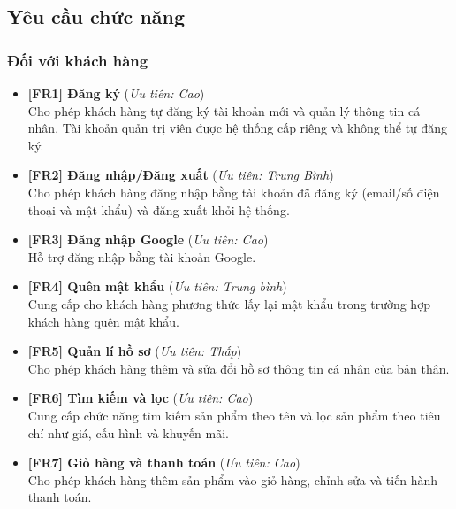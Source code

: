 \subsection{Yêu cầu chức năng}

 \subsubsection{Đối với khách hàng}

\begin{itemize}

\item \textbf{[FR1] Đăng ký} \hfill (\textit{Ưu tiên: Cao})\\
    Cho phép khách hàng tự đăng ký tài khoản mới và quản lý thông tin cá nhân. Tài khoản quản trị viên được hệ thống cấp riêng và không thể tự đăng ký.

\item \textbf{[FR2] Đăng nhập/Đăng xuất} \hfill (\textit{Ưu tiên: Trung Bình})\\
    Cho phép khách hàng đăng nhập bằng tài khoản đã đăng ký (email/số điện thoại và mật khẩu) và đăng xuất khỏi hệ thống.

\item \textbf{[FR3] Đăng nhập Google} \hfill (\textit{Ưu tiên: Cao})\\
    Hỗ trợ đăng nhập bằng tài khoản Google.

\item \textbf{[FR4] Quên mật khẩu} \hfill (\textit{Ưu tiên: Trung bình})\\
    Cung cấp cho khách hàng phương thức lấy lại mật khẩu trong trường hợp khách hàng quên mật khẩu.

\item \textbf{[FR5] Quản lí hồ sơ} \hfill (\textit{Ưu tiên: Thấp})\\
    Cho phép khách hàng thêm và sửa đổi hồ sơ thông tin cá nhân của bản thân.

\item \textbf{[FR6] Tìm kiếm và lọc} \hfill (\textit{Ưu tiên: Cao})\\
    Cung cấp chức năng tìm kiếm sản phẩm theo tên và lọc sản phẩm theo tiêu chí như giá, cấu hình và khuyến mãi.

\item \textbf{[FR7] Giỏ hàng và thanh toán} \hfill (\textit{Ưu tiên: Cao})\\
    Cho phép khách hàng thêm sản phẩm vào giỏ hàng, chỉnh sửa và tiến hành thanh toán.


\end{itemize}
